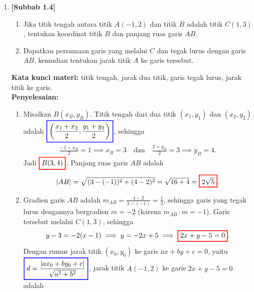 \documentclass[10pt,openany,a4paper]{article}
\theoremstyle{definition}
\theoremstyle{definition}
\theoremstyle{plain}
\newenvironment{jawab}[2][tes]{%
\par\noindent\textbf{Kata kunci materi:} #1.\\
\textbf{Penyelesaian:} #2%
}{}
\begin{document}
\begin{enumerate}
    \item \textbf{[Subbab 1.4]} \begin{enumerate}
        \item Jika titik tengah antara titik $A(-1,2)$ dan titik $B$ adalah titik $C(1,3)$, tentukan koordinat titik $B$ dan panjang ruas garis $AB$.
        \item Dapatkan persamaan garis yang melalui $C$ dan tegak lurus dengan garis $AB$, kemudian tentukan jarak titik $A$ ke garis tersebut.
    \end{enumerate}
    \begin{jawab}[titik tengah, jarak dua titik, garis tegak lurus, jarak titik ke garis]{
        \begin{enumerate}
            \item Misalkan $B(x_B,y_B)$. Titik tengah dari dua titik $(x_1,y_1)$ dan $(x_2,y_2)$ adalah $\colorlet{oldcolor}{.}
        \color{blue}
        \setlength{\fboxrule}{1pt} \boxed{\color{oldcolor}\left(\frac{x_1+x_2}{2},\frac{y_1+y_2}{2}\right)}\color{oldcolor}$, sehingga
            \begin{align*}
                \frac{-1+x_B}{2}=1 \implies x_B=3 \quad\text{dan}\quad \frac{2+y_B}{2}=3 \implies y_B=4.
            \end{align*}
            Jadi $\colorlet{oldcolor}{.}
        \color{red}
        \setlength{\fboxrule}{1pt} \boxed{\color{oldcolor}B(3,4)}\color{oldcolor}$. Panjang ruas garis $AB$ adalah
            \begin{align*}
                |AB|=\sqrt{(3-(-1))^2+(4-2)^2}=\sqrt{16+4}=\colorlet{oldcolor}{.}
        \color{red}
        \setlength{\fboxrule}{1pt} \boxed{\color{oldcolor}2\sqrt{5}}\color{oldcolor}.
            \end{align*}
            \item Gradien garis $AB$ adalah $m_{AB}=\frac{4-2}{3-(-1)}=\frac{1}{2}$, sehingga garis yang tegak lurus dengannya bergradien $m=-2$ (karena $m_{AB}\cdot m=-1$). Garis tersebut melalui $C(1,3)$, sehingga
            \begin{align*}
                y-3=-2(x-1) \implies y=-2x+5 \implies \colorlet{oldcolor}{.}
        \color{red}
        \setlength{\fboxrule}{1pt} \boxed{\color{oldcolor}2x+y-5=0}\color{oldcolor}.
            \end{align*}
            Dengan rumus jarak titik $(x_0,y_0)$ ke garis $ax+by+c=0$, yaitu $\colorlet{oldcolor}{.}
        \color{blue}
        \setlength{\fboxrule}{1pt} \boxed{\color{oldcolor}d=\frac{|ax_0+by_0+c|}{\sqrt{a^2+b^2}}}\color{oldcolor}$, jarak titik $A(-1,2)$ ke garis $2x+y-5=0$ adalah

\end{enumerate}}
\end{jawab}
\end{enumerate}
\end{document}
